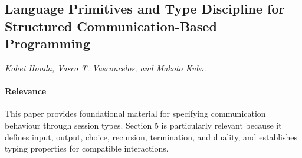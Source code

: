 \documentclass{article}
\begin{document}
\subsection{Language Primitives and Type Discipline for Structured Communication-Based Programming}
\textit{Kohei Honda, Vasco T. Vasconcelos, and Makoto Kubo.}~\cite{honda-v-k-1998}

\paragraph{Relevance}
This paper provides foundational material for specifying communication behaviour
through session types. Section 5 is particularly relevant because it defines input,
output, choice, recursion, termination, and duality, and establishes typing properties
for compatible interactions. 
\end{document}
